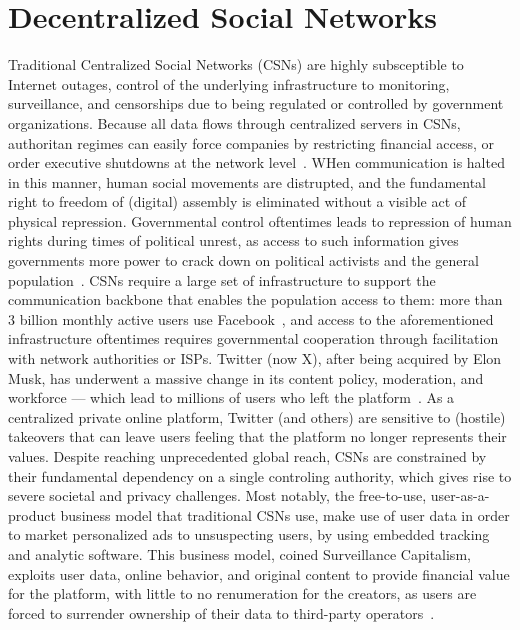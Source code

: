 \section{Decentralized Social Networks}
\label{sec:dsn}
Traditional Centralized Social Networks (CSNs) are highly subsceptible to Internet outages, control of the underlying infrastructure to monitoring, surveillance, and censorships due to being regulated or controlled by government organizations. Because all data flows through centralized servers in CSNs, authoritan regimes can easily force companies by restricting financial access, or order executive shutdowns at the network level~\cite{Lopez2026}. WHen communication is halted in this manner, human social movements are distrupted, and the fundamental right to freedom of (digital) assembly is eliminated without a visible act of physical repression. Governmental control oftentimes leads to repression of human rights during times of political unrest, as access to such information gives governments more power to crack down on political activists and the general population~\cite{digital-repression-palestine,internet-shutdown-human-rights}. CSNs require a large set of infrastructure to support the communication backbone that enables the population access to them: more than 3 billion monthly active users use Facebook~\cite{FBMAU}, and access to the aforementioned infrastructure oftentimes requires governmental cooperation through facilitation with network authorities or ISPs.
Twitter (now X), after being acquired by Elon Musk, has underwent a massive change in its content policy, moderation, and workforce --- which lead to millions of users who left the platform~\cite{Balduf2024}. As a centralized private online platform, Twitter (and others) are sensitive to (hostile) takeovers that can leave users feeling that the platform no longer represents their values.
Despite reaching unprecedented global reach, CSNs are constrained by their fundamental dependency on a single controling authority, which gives rise to severe societal and privacy challenges. Most notably, the free-to-use, user-as-a-product business model that traditional CSNs use, make use of user data in order to market personalized ads to unsuspecting users, by using embedded tracking and analytic software.
This business model, coined Surveillance Capitalism, exploits user data, online behavior, and original content to provide financial value for the platform, with little to no renumeration for the creators, as users are forced to surrender ownership of their data to third-party operators~\cite{Zuboff2023}.
